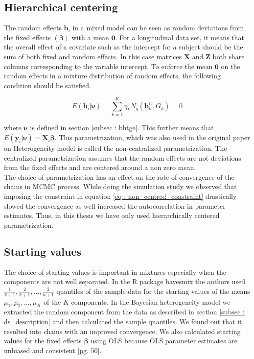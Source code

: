 \subsection{Hierarchical centering}
The random effects $\boldsymbol{b}_i$ in a mixed model can be seen as random deviations from the fixed effects $(\boldsymbol{\beta})$ with a mean $\boldsymbol{0}$. For a longitudinal data set, it means that the overall effect of a covariate such as the intercept for a subject should be the sum of both fixed and random effects. In this case matrices $\boldsymbol{X}$ and $\boldsymbol{Z}$ both share columns corresponding to the variable intercept. To enforce the mean $\boldsymbol{0}$ on the random effects in a mixture distribution of random effects, the following condition should be satisfied.

\begin{equation}
\label{eq : non_centred_constraint}
E(\boldsymbol{b}_i | \boldsymbol{\nu}) = \sum_{k=1}^{K} \eta_k N_q(\boldsymbol{b}_k^C, G_k) = 0
\end{equation}

where $\boldsymbol{\nu}$ is defined in section \ref{subsec : bhtge}. This further means that $E(\boldsymbol{y}_i | \boldsymbol{\nu}) = \boldsymbol{X}_{i}\boldsymbol{\beta}$. This parametrization, which was also used in the original paper on Heterogeneity model \citep{verbeke_linear_1996} is called the non-centralized parametrization. The centralized parametrization assumes that the random effects are not deviations from the fixed effects and are centered around a non zero mean.\\

The choice of parametrization has an effect on the rate of convergence of the chains in MCMC process. While doing the simulation study we observed that imposing the constraint in equation \ref{eq : non_centred_constraint} drastically slowed the convergence as well increased the autocorrelation in parameter estimates. Thus, in this thesis we have only used hierarchically centered parametrization.

\subsection{Starting values}
\label{subsec : choice_starting_values}
The choice of starting values is important in mixtures especially when the components are not well separated. In the R package bayesmix \citep{gruen_bayesmix:_2015} the authors used $\frac 1 {k+1}, \frac 2 {k+1}, ..., \frac 2 {k+1}$ quantiles of the sample data for the starting values of the means $\mu_1, \mu_2, ..., \mu_K$ of the $K$ components. In the Bayesian heterogeneity model we extracted the random component from the data as described in section \ref{subsec : ds_description} and then calculated the sample quantiles. We found out that it resulted into chains with an improved convergence. We also calculated starting values for the fixed effects $\boldsymbol{\beta}$ using OLS because OLS parameter estimates are unbiased and consistent [pg. 50]\citep{verbeke_linear_2009}.

